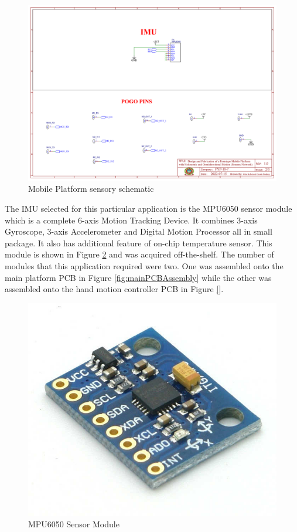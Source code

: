 \begin{figure}[H]
    \centering
    \includegraphics[scale=0.4]{Figures/MPsensory.png}
    \caption{Mobile Platform sensory schematic}
    \label{fig:mobileplatformsensory}
\end{figure}

\par
The \ac{IMU} selected for this particular application is the MPU6050 sensor module which is a complete 6-axis Motion Tracking Device. It combines 3-axis Gyroscope, 3-axis Accelerometer and Digital Motion Processor all in small package\cite{noauthor_mpu6050_nodate}. It also has additional feature of on-chip temperature sensor. This module is shown in Figure \ref{fig:mpu6050} and was acquired off-the-shelf. The number of modules that this application required were two. One was assembled onto the main platform \ac{PCB} in Figure \ref{fig:mainPCBAssembly} while the other was assembled onto the hand motion controller \ac{PCB} in Figure \ref{}.


\begin{figure}[H]
    \centering
    \includegraphics[scale=0.4]{Figures/MPU6050Module.jpg}
    \caption{MPU6050 Sensor Module}
    \label{fig:mpu6050}
\end{figure}

